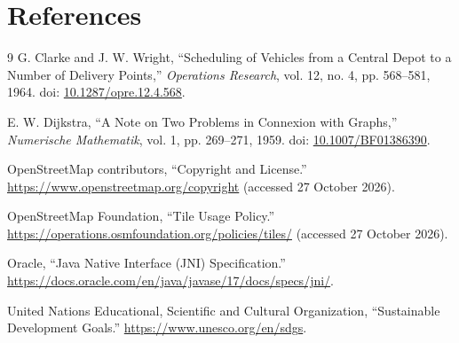 \documentclass[11pt,a4paper]{article}
\begin{document}
\section*{References}
\begin{thebibliography}{9}
G. Clarke and J. W. Wright, ``Scheduling of Vehicles from a Central Depot to
a Number of Delivery Points,'' \textit{Operations Research}, vol. 12, no. 4,
pp. 568--581, 1964. doi: \href{https://doi.org/10.1287/opre.12.4.568}
{10.1287/opre.12.4.568}.

E. W. Dijkstra, ``A Note on Two Problems in Connexion with Graphs,''
\textit{Numerische Mathematik}, vol. 1, pp. 269--271, 1959. doi:
\href{https://doi.org/10.1007/BF01386390}{10.1007/BF01386390}.

OpenStreetMap contributors, ``Copyright and License.''
\url{https://www.openstreetmap.org/copyright} (accessed 27 October 2026).

OpenStreetMap Foundation, ``Tile Usage Policy.''
\url{https://operations.osmfoundation.org/policies/tiles/}
(accessed 27 October 2026).

Oracle, ``Java Native Interface (JNI) Specification.''
\url{https://docs.oracle.com/en/java/javase/17/docs/specs/jni/}.

United Nations Educational, Scientific and Cultural Organization,
``Sustainable Development Goals.''
\url{https://www.unesco.org/en/sdgs}.
\end{thebibliography}
\end{document}
